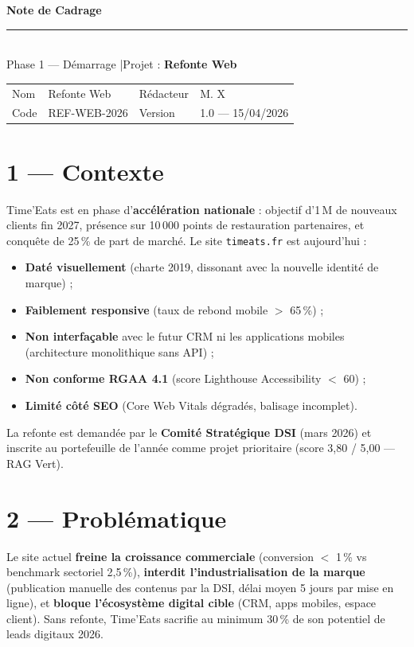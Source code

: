 \documentclass[11pt,a4paper,oneside]{report}
\begin{document}
\small

\begin{center}
{\LARGE\bfseries\color{cnNavy} Note de Cadrage}\\[4pt]
\textcolor{cnOrange}{\rule{10cm}{1pt}}\\[4pt]
{\large\color{cnSlate} Phase 1 — Démarrage \quad|\quad Projet : \textbf{Refonte Web}}
\end{center}

\vspace{6pt}
\renewcommand{\arraystretch}{1.4}
\begin{tabularx}{\textwidth}{L{3.5cm} Y L{3.5cm} Y}
\toprule
{} & \th{} &  & \th{} \\
\midrule
Nom & Refonte Web & Rédacteur & M. X \\
Code & REF-WEB-2026 & Version & 1.0 — 15/04/2026 \\
\bottomrule
\end{tabularx}

\section*{1 — Contexte}
Time'Eats est en phase d'\textbf{accélération nationale} : objectif d'1\,M de nouveaux clients fin 2027, présence sur 10\,000 points de restauration partenaires, et conquête de 25\,\% de part de marché. Le site \texttt{timeats.fr} est aujourd'hui :
\begin{itemize}
  \item \textbf{Daté visuellement} (charte 2019, dissonant avec la nouvelle identité de marque) ;
  \item \textbf{Faiblement responsive} (taux de rebond mobile $>$ 65\,\%) ;
  \item \textbf{Non interfaçable} avec le futur CRM ni les applications mobiles (architecture monolithique sans API) ;
  \item \textbf{Non conforme RGAA 4.1} (score Lighthouse Accessibility $<$ 60) ;
  \item \textbf{Limité côté SEO} (Core Web Vitals dégradés, balisage incomplet).
\end{itemize}
La refonte est demandée par le \textbf{Comité Stratégique DSI} (mars 2026) et inscrite au portefeuille de l'année comme projet prioritaire (score 3{,}80 / 5{,}00 — RAG Vert).

\section*{2 — Problématique}
\begin{alert}
Le site actuel \textbf{freine la croissance commerciale} (conversion $<$ 1\,\% vs benchmark sectoriel 2{,}5\,\%), \textbf{interdit l'industrialisation de la marque} (publication manuelle des contenus par la DSI, délai moyen 5 jours par mise en ligne), et \textbf{bloque l'écosystème digital cible} (CRM, apps mobiles, espace client). Sans refonte, Time'Eats sacrifie au minimum 30\,\% de son potentiel de leads digitaux 2026.
\end{alert}
\end{document}
